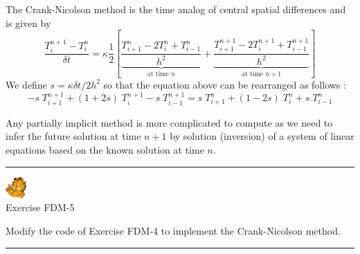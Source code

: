 The Crank-Nicolson method is the time analog of central spatial differences and is given by
\begin{equation}
\frac{T_{i}^{n+1}-T_i^n}{\delta t} 
= \kappa  \frac{1}{2} \left[
\underbrace{\frac{T_{i+1}^{n} - 2T_i^{n} + T_{i-1}^{n}}{h^2}}_{\text{at time } n}
+
\underbrace{\frac{T_{i+1}^{n+1} - 2T_i^{n+1} + T_{i-1}^{n+1}}{h^2}}_{\text{at time } n+1}
\right]
\end{equation}
We define $s=\kappa \delta t/ 2h^2$ so that the equation above can be rearranged as follows :
\begin{equation}
\boxed{
-s\; T_{i+1}^{n+1} + (1+2s)\;  T_{i}^{n+1} 
-s\;  T_{i-1}^{n+1} = 
s\; T_{i+1}^{n} + (1-2s)\; T_{i}^{n} + s\; T_{i-1}^{n} 
}
\end{equation}

Any partially implicit method is more complicated to compute as we need to infer the future solution 
at time $n+1$ by solution (inversion) of a system of linear equations based on the known solution at time $n$. 

\begin{center}

\end{center}

\begin{center}
\begin{minipage}[t]{0.77\textwidth}
\par\noindent\rule{\textwidth}{0.4pt}

\begin{center}
\includegraphics[width=0.8cm]{images/garftr} \\
{\color{orange}Exercise FDM-5}
\end{center}

Modify the code of Exercise FDM-4 to implement the Crank-Nicolson method.

\par\noindent\rule{\textwidth}{0.4pt}
\end{minipage}
\end{center}





